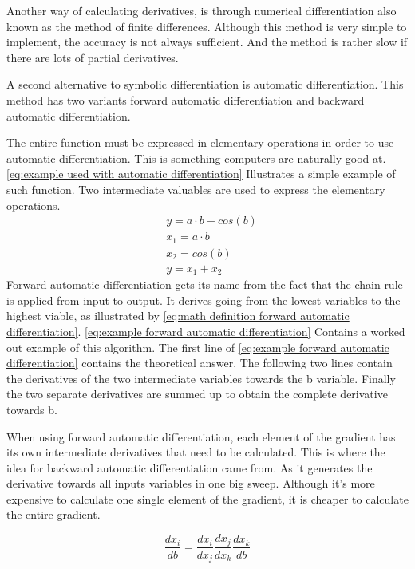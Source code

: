 Another way of calculating derivatives, is through numerical differentiation also known as the method of finite differences. Although this method is very simple to implement, the accuracy is not always sufficient. And the method is rather slow if there are lots of partial derivatives.

A second alternative to symbolic differentiation is automatic differentiation. This method has two variants forward automatic differentiation and backward automatic differentiation.

The entire function must be expressed in elementary operations in order to use automatic differentiation. This is something computers are naturally good at. \eqref{eq:example used with automatic differentiation} Illustrates a simple example of such function. Two intermediate valuables are used to express the elementary operations.
\begin{equation}
	\begin{aligned}
		& y = a \cdot b + cos(b) \\
		& x_1 = a \cdot b \\
		& x_2 = cos(b) \\
		& y = x_1 + x_2		
	\end{aligned}
	\label{eq:example used with automatic differentiation}
\end{equation}
Forward automatic differentiation gets its name from the fact that the chain rule is applied from input to output. It derives going from the lowest variables to the highest viable, as illustrated by \eqref{eq:math definition forward automatic differentiation}. \eqref{eq:example forward automatic differentiation} Contains a worked out example of this algorithm. The first line of \eqref{eq:example forward automatic differentiation} contains the theoretical answer. The following two lines contain the derivatives of the two intermediate variables towards the b variable. Finally the two separate derivatives are summed up to obtain the complete derivative towards b.

When using forward automatic differentiation, each element of the gradient has its own intermediate derivatives that need to be calculated. This is where the idea for backward automatic differentiation came from. As it generates the derivative towards all inputs variables in one big sweep. Although it's more expensive to calculate one single element of the gradient, it is cheaper to calculate the entire gradient.

\begin{equation}
	\frac{dx_i}{db} = \frac{dx_i}{dx_j}\frac{dx_j}{dx_k}\frac{dx_k}{db}
	\label{eq:math definition forward automatic differentiation}
\end{equation}


